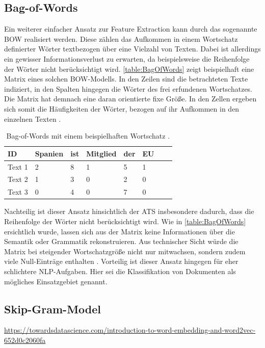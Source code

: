 \subsection{Bag-of-Words}
\noindent
Ein weiterer einfacher Ansatz zur Feature Extraction kann durch das sogenannte \ac{BOW} realisiert werden. Diese zählen das Aufkommen in einem Wortschatz definierter Wörter textbezogen über eine Vielzahl von Texten. Dabei ist allerdings ein gewisser Informationsverlust zu erwarten, da beispielsweise die Reihenfolge der Wörter nicht berücksichtigt wird. \autoref{table:BagOfWords} zeigt beispielhaft eine Matrix eines solchen \ac{BOW}-Modells. In den Zeilen sind die betrachteten Texte indiziert, in den Spalten hingegen die Wörter des frei erfundenen Wortschatzes. Die Matrix hat demnach eine daran orientierte fixe Größe. In den Zellen ergeben sich somit die Häufigkeiten der Wörter, bezogen auf ihr Aufkommen in den einzelnen Texten \cite{BRO19}.

\begin{table}[htb]
\centering
\begin{tabular}{ | p{1.8cm} | p{1.8cm} | p{1.8cm} | p{1.8cm} | p{1.8cm} | p{1.8cm} | p{1.8cm} | p{1.8cm} | }
\hline
\textbf{ID} & \textbf{Spanien} & \textbf{ist} & \textbf{Mitglied} & \textbf{der} & \textbf{EU} \\
\hline
Text 1 & 2 & 8 & 1 & 5 & 1 \\
\hline
Text 2 & 1 & 3 & 0 & 2 & 0 \\
\hline
Text 3 & 0 & 4 & 0 & 7 & 0 \\
\hline
\end{tabular}
\caption{Bag-of-Words mit einem beispielhaften Wortschatz \cite{HUI20}.}
\label{table:BagOfWords}
\end{table}
\newpage

\noindent
Nachteilig ist dieser Ansatz hinsichtlich der \ac{ATS} insbesondere dadurch, dass die Reihenfolge der Wörter nicht berücksichtigt wird. Wie in \autoref{table:BagOfWords} ersichtlich wurde, lassen sich aus der Matrix keine Informationen über die Semantik oder Grammatik rekonstruieren. Aus technischer Sicht würde die Matrix bei steigender Wortschatzgröße nicht nur mitwachsen, sondern zudem viele Null-Einträge enthalten \cite{HUI20}. Vorteilig ist dieser Ansatz hingegen für eher schlichtere \ac{NLP}-Aufgaben. Hier sei die Klassifikation von Dokumenten als mögliches Einsatzgebiet genannt.


\subsection{Skip-Gram-Model}
\noindent
\url{https://towardsdatascience.com/introduction-to-word-embedding-and-word2vec-652d0c2060fa}

